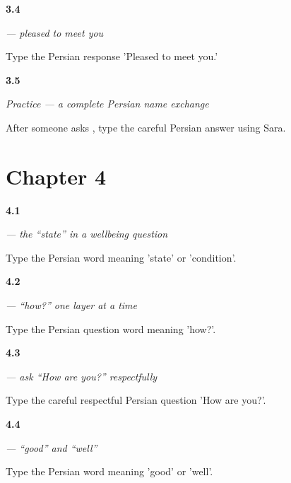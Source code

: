 \noindent\begin{minipage}[t]{\linewidth}
\raggedright
\hypertarget{review-FA-C03-khoshvaghtam-close}{\textbf{3.4}} \emph{ — pleased to meet you}\par
\small Type the Persian response 'Pleased to meet you.'
\end{minipage}\par\medskip

\noindent\begin{minipage}[t]{\linewidth}
\raggedright
\hypertarget{review-FA-C03-practice-next-line}{\textbf{3.5}} \emph{Practice — a complete Persian name exchange}\par
\small After someone asks   , type the careful Persian answer using Sara.
\end{minipage}\par\medskip

\section*{Chapter 4}

\noindent\begin{minipage}[t]{\linewidth}
\raggedright
\hypertarget{review-FA-C04-hal-meaning}{\textbf{4.1}} \emph{ — the “state” in a wellbeing question}\par
\small Type the Persian word meaning 'state' or 'condition'.
\end{minipage}\par\medskip

\noindent\begin{minipage}[t]{\linewidth}
\raggedright
\hypertarget{review-FA-C04-chetor-how}{\textbf{4.2}} \emph{ — “how?” one layer at a time}\par
\small Type the Persian question word meaning 'how?'.
\end{minipage}\par\medskip

\noindent\begin{minipage}[t]{\linewidth}
\raggedright
\hypertarget{review-FA-C04-hal-e-shoma-chetor-ast-question}{\textbf{4.3}} \emph{    — ask “How are you?” respectfully}\par
\small Type the careful respectful Persian question 'How are you?'.
\end{minipage}\par\medskip

\noindent\begin{minipage}[t]{\linewidth}
\raggedright
\hypertarget{review-FA-C04-khub-good}{\textbf{4.4}} \emph{ — “good” and “well”}\par
\small Type the Persian word meaning 'good' or 'well'.
\end{minipage}\par\medskip

